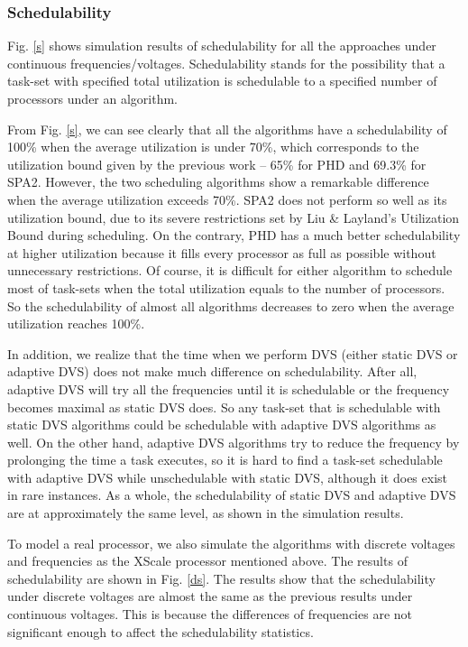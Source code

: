 \documentclass[12pt, journal,compsoc]{IEEEtran}
\begin{document}
\subsubsection{Schedulability}

Fig. \ref{s} shows simulation results of schedulability for all the
approaches under continuous frequencies/voltages.
Schedulability stands for the possibility that a task-set with specified total utilization is schedulable to a specified number of processors under an algorithm.

From Fig. \ref{s}, we can see clearly that all the algorithms have a schedulability of 100\% when the average utilization is under 70\%, which corresponds to the utilization bound given by the previous work -- 65\% for PHD and 69.3\% for SPA2. However, the two scheduling algorithms show a remarkable difference when the average utilization exceeds 70\%. SPA2 does not perform so well as its utilization bound, due to its severe restrictions set by Liu \& Layland's Utilization Bound \cite{Liu:1973:SAM:321738.321743} during scheduling. On the contrary, PHD has a much better schedulability at higher utilization because it fills every processor as full as possible without unnecessary restrictions. Of course, it is difficult for either algorithm to schedule most of task-sets when the total utilization equals to the number of processors. So the schedulability of almost all algorithms decreases to zero when the average utilization reaches 100\%.

In addition, we realize that the time when we perform DVS (either static DVS or adaptive DVS) does not make much difference on schedulability. After all, adaptive DVS will try all the frequencies until it is schedulable or the frequency becomes maximal as static DVS does. So any task-set that is schedulable with static DVS algorithms could be schedulable with adaptive DVS algorithms as well. On the other hand, adaptive DVS algorithms try to reduce the frequency by prolonging the time a task executes, so it is hard to find a task-set schedulable with adaptive DVS while unschedulable with static DVS, although it does exist in rare instances. As a whole, the schedulability of static DVS and adaptive DVS are at approximately the same level, as shown in the simulation results.

To model a real processor, we also simulate the algorithms with discrete voltages and frequencies as the XScale processor mentioned above. The results of schedulability are shown in Fig. \ref{ds}. The results show that the schedulability under discrete voltages are almost the same as the previous results under continuous voltages. This is because the differences of frequencies are not significant enough to affect the schedulability statistics.
\end{document}
